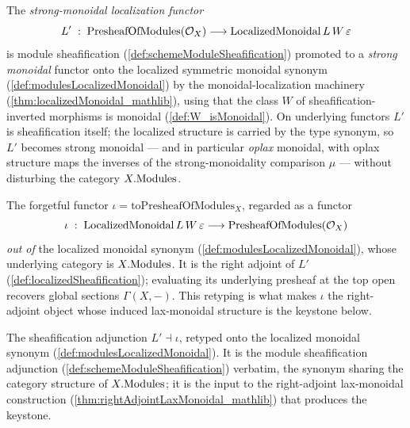 \begin{definition}
  \label{def:localizedSheafification}
  The \emph{strong-monoidal localization functor}
  \[
    L' \;:\; \mathrm{PresheafOfModules}(\mathcal{O}_X) \longrightarrow
      \mathrm{LocalizedMonoidal}\,L\,W\,\varepsilon
  \]
  is module sheafification (\cref{def:schemeModuleSheafification}) promoted to a
  \emph{strong monoidal} functor onto the localized symmetric monoidal synonym
  (\cref{def:modulesLocalizedMonoidal}) by the monoidal-localization machinery
  (\cref{thm:localizedMonoidal_mathlib}), using that the class \(W\) of
  sheafification-inverted morphisms is monoidal (\cref{def:W_isMonoidal}). On
  underlying functors \(L'\) is sheafification itself; the localized structure is
  carried by the type synonym, so \(L'\) becomes strong monoidal --- and in
  particular \emph{oplax} monoidal, with oplax structure maps the inverses of the
  strong-monoidality comparison \(\mu\) --- without disturbing the category
  \(X.\mathrm{Modules}\).
\end{definition}

\begin{definition}
  \label{def:toPresheafLocalized}
  The forgetful functor
  \(\iota = \mathrm{toPresheafOfModules}_X\), regarded as a functor
  \[
    \iota \;:\; \mathrm{LocalizedMonoidal}\,L\,W\,\varepsilon \longrightarrow
      \mathrm{PresheafOfModules}(\mathcal{O}_X)
  \]
  \emph{out of} the localized monoidal synonym (\cref{def:modulesLocalizedMonoidal}),
  whose underlying category is \(X.\mathrm{Modules}\). It is the right adjoint of \(L'\)
  (\cref{def:localizedSheafification}); evaluating its underlying presheaf at the
  top open recovers global sections \(\Gamma(X,-)\). This retyping is what makes
  \(\iota\) the right-adjoint object whose induced lax-monoidal structure is the
  keystone below.
\end{definition}

\begin{definition}
  \label{def:localizedSheafificationAdjunction}
  The sheafification adjunction \(L' \dashv \iota\), retyped onto the localized
  monoidal synonym (\cref{def:modulesLocalizedMonoidal}). It is the module
  sheafification adjunction (\cref{def:schemeModuleSheafification}) verbatim, the
  synonym sharing the category structure of \(X.\mathrm{Modules}\); it is the input to the
  right-adjoint lax-monoidal construction (\cref{thm:rightAdjointLaxMonoidal_mathlib})
  that produces the keystone.
\end{definition}

